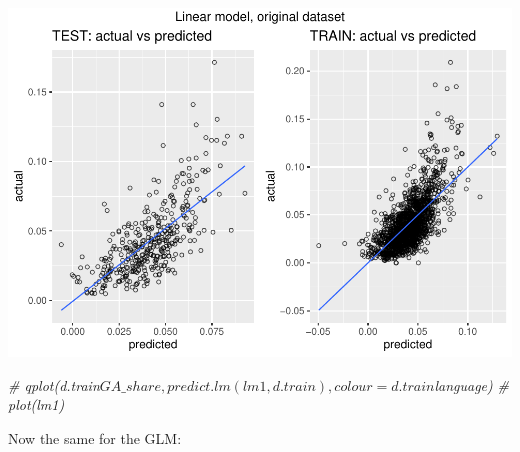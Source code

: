 \documentclass[
]{article}
\newenvironment{Shaded}{\begin{snugshade}}{\end{snugshade}}
\newcommand{\CommentTok}[1]{\textcolor[rgb]{0.56,0.35,0.01}{\textit{#1}}}
\begin{document}
\includegraphics{Lin_Mod_Clus_Analysis_files/figure-latex/unnamed-chunk-31-1.pdf}

\begin{Shaded}
\begin{Highlighting}[]
\CommentTok{\# qplot(d.train$GA\_share, predict.lm(lm1, d.train), colour = d.train$language)}
\CommentTok{\# plot(lm1)}
\end{Highlighting}
\end{Shaded}

Now the same for the GLM:
\end{document}
